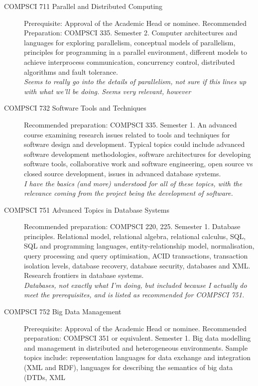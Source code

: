 \documentclass[10pt,a4paper]{article}
\begin{document}
\begin{description}
\item[COMPSCI 711 Parallel and Distributed Computing] Prerequisite:
  Approval of the Academic Head or nominee. Recommended Preparation:
  COMPSCI 335. Semester 2. Computer architectures and languages for
  exploring parallelism, conceptual models of parallelism, principles
  for programming in a parallel environment, different models to achieve
  interprocess communication, concurrency control, distributed
  algorithms and fault tolerance.\\
  \textit{Seems to really go into the details of parallelism, not sure
    if this lines up with what we'll be doing. Seems very relevant,
    however}
\item[COMPSCI 732 Software Tools and Techniques] Recommended
  preparation: COMPSCI 335. Semester 1. An advanced course examining
  research issues related to tools and techniques for software design
  and development. Typical topics could include advanced software
  development methodologies, software architectures for developing
  software tools, collaborative work and software engineering, open
  source vs closed source development, issues in advanced database
  systems.\\
  \textit{I have the basics (and more) understood for all of these
    topics, with the relevance coming from the project being the
    development of software.}
\item[COMPSCI 751 Advanced Topics in Database Systems] Recommended
  preparation: COMPSCI 220, 225. Semester 1. Database principles.
  Relational model, relational algebra, relational calculus, SQL, SQL
  and programming languages, entity-relationship model, normalisation,
  query processing and query optimisation, ACID transactions,
  transaction isolation levels, database recovery, database security,
  databases and XML. Research frontiers in database systems.\\
  \textit{Databases, not exactly what I'm doing, but included because
    I actually do meet the prerequisites, and is listed as recommended
    for COMPSCI 751.}
\item[COMPSCI 752 Big Data Management] Prerequisite: Approval of the
  Academic Head or nominee. Recommended preparation: COMPSCI 351 or
  equivalent. Semester 1. Big data modelling and management in
  distributed and heterogeneous environments. Sample topics include:
  representation languages for data exchange and integration (XML and
  RDF), languages for describing the semantics of big data (DTDs, XML

\end{description}
\end{document}
